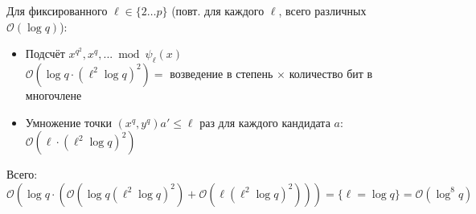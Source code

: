 \documentclass[12pt]{article}
\newcommand{\bigO}{\mathcal{O}}
\theoremstyle{definition}
\theoremstyle{definition}
\theoremstyle{definition}
\begin{document}
Для фиксированного $\ell\in\{2 \ldots p\}$ (повт. для каждого $\ell$, всего различных $\bigO(\log q)$):
\begin{itemize}
    \item Подсчёт $x^{q^2}, x^q, ... \bmod \psi_\ell(x)$\\
    $\bigO(\log q \cdot (\ell^2 \log q)^2) = $ возведение в степень $\times$ количество бит в многочлене
    
    \item Умножение точки $(x^q, y^q) a' \leq \ell$ раз для каждого кандидата $a:$\\
    $\bigO(\ell\cdot(\ell^2 \log q)^2)$
\end{itemize}
Всего: $\bigO(\log q \cdot(\bigO(\log q (\ell^2 \log q)^2) + \bigO(\ell(\ell^2 \log q)^2))) = \{\ell=\log q\} = \bigO(\log^8 q)$
\end{document}
